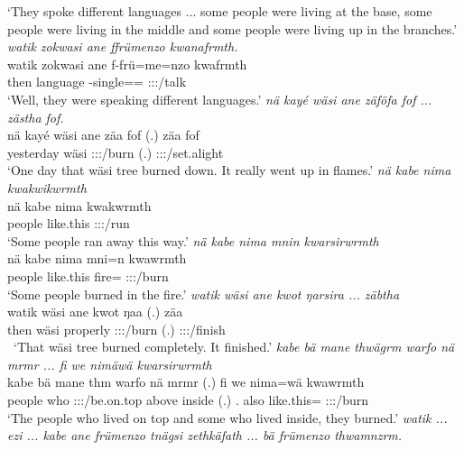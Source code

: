 \begin{exe}
	\trans `They spoke different languages ... some people were living at the base, some people were living in the middle and some people were living up in the branches.'
	\emph{watik zokwasi ane ffrümenzo kwanafrmth.}\\
	\gll watik zokwasi ane f-frü=me=nzo kwafrmth\\ 
	then language {\Dem} \Redup-single=\Ins={\Only} \Stpl:\Sbj:\Pst:\Dur/talk\\
	\trans `Well, they were speaking different languages.'
	\emph{nä kayé wäsi ane zäföfa fof ... zästha fof.}\\
	\gll nä kayé wäsi ane zäa fof (.) zäa fof\\ 
	{\Indf} yesterday wäsi {\Dem} \Sg:\Sbj:\Pst:\Ipfv/burn {\Emph} (.) \Sg:\Sbj:\Pst:\Pfv/set.alight {\Emph}\\
	\trans `One day that wäsi tree burned down. It really went up in flames.'
	\emph{nä kabe nima kwakwikwrmth}\\
	\gll nä kabe nima kwakwrmth\\ 
	{\Indf} people like.this \Stpl:\Sbj:\Pst:\Dur/run\\
	\trans `Some people ran away this way.'
	\emph{nä kabe nima mnin kwarsirwrmth}\\
	\gll nä kabe nima mni=n kwawrmth\\ 
	{\Indf} people like.this fire={\Loc} \Stpl:\Sbj:\Pst:\Dur/burn\\
	\trans `Some people burned in the fire.'
	\emph{watik wäsi ane kwot ŋarsira ... zäbtha}\\
	\gll watik wäsi ane kwot ŋaa (.) zäa\\ 
	then wäsi {\Dem} properly \Sg:\Sbj:\Pst:\Ipfv/burn (.) \Sg:\Sbj:\Pst:\Pfv/finish\\\
	\trans `That wäsi tree burned completely. It finished.'
	\emph{kabe bä mane thwägrm warfo nä mrmr ... fi we nimäwä kwarsirwrmth}\\
	\gll kabe bä mane th\stem{wägr}m warfo nä mrmr (.) fi we nima=wä kwawrmth\\ 
	people \Med{} who \Stpl:\Sbj:\Pst:\Dur/be.on.top above {\Indf} inside (.) \Third.{\Abs} also like.this={\Emph} \Stpl:\Sbj:\Pst:\Dur/burn\\
	\trans `The people who lived on top and some who lived inside, they burned.'
\exi{27} 
	\emph{watik ... ezi ... kabe ane frümenzo tnägsi zethkäfath ... bä frümenzo thwamnzrm.}\\

\end{exe}
